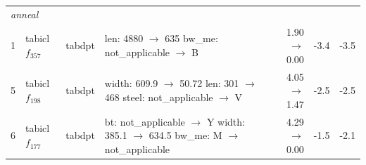 \begin{table}[t]
\begin{tabularx}{\textwidth}{rllXrrr}
\midrule
\multicolumn{7}{l}{\textit{anneal}} \\
1 & tabicl $f_{357}$ & tabdpt & \makecell[tl]{len: 4880 $\to$ 635 \\ bw\_me: not\_applicable $\to$ B} & 1.90 $\to$ 0.00 & -3.4 & -3.5 \\
5 & tabicl $f_{198}$ & tabdpt & \makecell[tl]{width: 609.9 $\to$ 50.72 \\ len: 301 $\to$ 468 \\ steel: not\_applicable $\to$ V} & 4.05 $\to$ 1.47 & -2.5 & -2.5 \\
6 & tabicl $f_{177}$ & tabdpt & \makecell[tl]{bt: not\_applicable $\to$ Y \\ width: 385.1 $\to$ 634.5 \\ bw\_me: M $\to$ not\_applicable} & 4.29 $\to$ 0.00 & -1.5 & -2.1 \\
\bottomrule
\end{tabularx}
\end{table}
